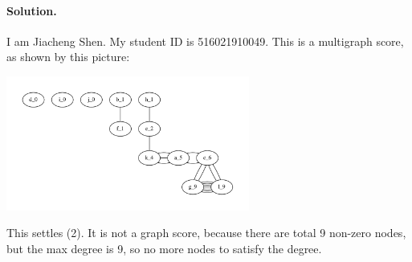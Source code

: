 \paragraph{Solution.} I am Jiacheng Shen. My student ID is 516021910049. 
This is a multigraph score, as shown by this picture:
\begin{center}
\includegraphics[width=0.6\textwidth]{figures/graph-516021910049.pdf}
\end{center}
This settles (2). It is not a graph score, because there are total 9 non-zero nodes, but the max degree is 9, so no more nodes to satisfy the degree.
